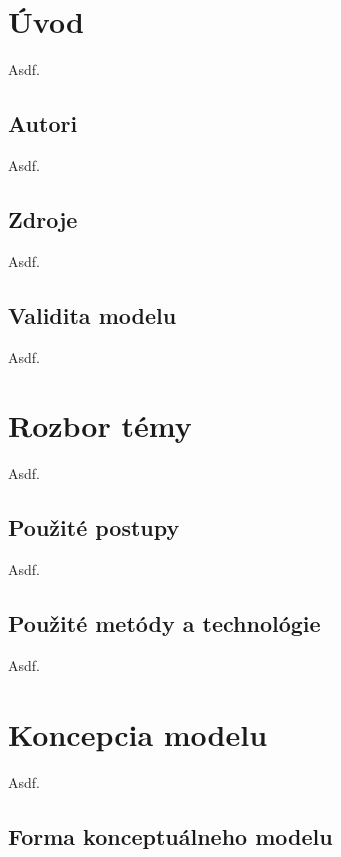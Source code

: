 \documentclass[11pt,a4paper]{article}
\begin{document}
\setlength{\parskip}{0pt}
\hypersetup{hidelinks}\tableofcontents
\setlength{\parskip}{0pt}

\newpage %

\section{Úvod}

    Asdf.\cite{X}

    \subsection{Autori}
        Asdf.

    \subsection{Zdroje}
        Asdf.

    \subsection{Validita modelu}
        Asdf.

\section{Rozbor témy}

    Asdf.

    \subsection{Použité postupy}

        Asdf.

    \subsection{Použité metódy a technológie}

        Asdf.

\section{Koncepcia modelu}

    Asdf.

    \subsection{Forma konceptuálneho modelu}
\end{document}
